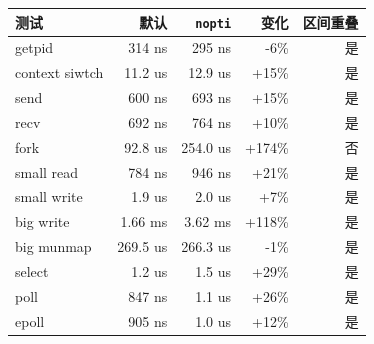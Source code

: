 \begin{tabular}{@{}lrrrr@{}}
\toprule
测试 & 默认 & \texttt{nopti} & 变化 & 区间重叠 \\
\midrule
getpid & 314 ns & 295 ns & -6\% & 是 \\
context siwtch & 11.2 us & 12.9 us & +15\% & 是 \\
send & 600 ns & 693 ns & +15\% & 是 \\
recv & 692 ns & 764 ns & +10\% & 是 \\
fork & 92.8 us & 254.0 us & +174\% & 否 \\
small read & 784 ns & 946 ns & +21\% & 是 \\
small write & 1.9 us & 2.0 us & +7\% & 是 \\
big write & 1.66 ms & 3.62 ms & +118\% & 是 \\
big munmap & 269.5 us & 266.3 us & -1\% & 是 \\
select & 1.2 us & 1.5 us & +29\% & 是 \\
poll & 847 ns & 1.1 us & +26\% & 是 \\
epoll & 905 ns & 1.0 us & +12\% & 是 \\
\bottomrule
\end{tabular}

